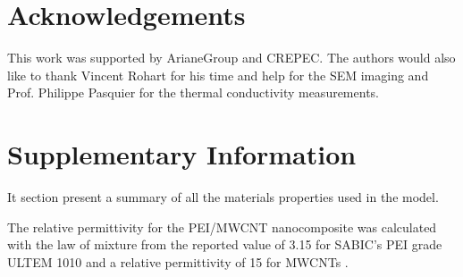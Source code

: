 \section{Acknowledgements}

This work was supported by ArianeGroup and CREPEC. 
The authors would also like to thank Vincent Rohart for his time and help for the SEM imaging and Prof. Philippe Pasquier for the thermal conductivity measurements. 

\section{Supplementary Information}

It section present a summary of all the materials properties used in the model. 

The relative permittivity for the PEI/MWCNT nanocomposite was calculated with the law of mixture from the reported value of 3.15 for SABIC’s PEI grade ULTEM 1010 and a relative permittivity of 15 for MWCNTs \cite{Katsounaros2011}. 

